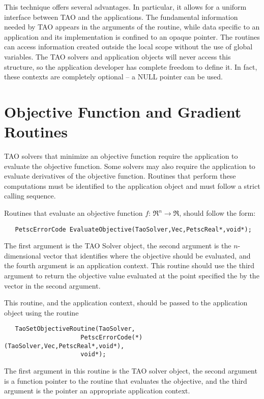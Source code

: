 This technique offers several advantages.
In particular, it allows for a uniform interface between TAO and 
the applications.   The fundamental information needed by TAO 
appears in the arguments of the routine, while data specific to an application
and its implementation is confined to an opaque pointer.
The routines can access information created outside the 
local scope without the use of global variables.
The TAO solvers and application objects will never access this structure, 
so the application developer has complete freedom to define it.  In fact,
these contexts are completely optional -- a NULL pointer can be used.



\section{Objective Function and Gradient Routines}\label{sec:fghj}

TAO solvers that minimize an objective function require
the application to evaluate the objective function.  Some solvers
may also require the application to evaluate
derivatives of the objective function.  
Routines that perform these computations must be identified
to the application object and must follow a strict calling sequence.

Routines that evaluate an objective function $f: \, \Re^n \to \Re$,
should follow the form:
\begin{verbatim}
   PetscErrorCode EvaluateObjective(TaoSolver,Vec,PetscReal*,void*);
\end{verbatim}
\noindent
The first argument is the TAO Solver object, the second argument is the
$n$-dimensional vector that identifies where the objective should be evaluated, 
and the fourth argument is an application context.
This routine should use the third argument to return the objective value 
evaluated at the point
specified the by the vector in the second argument.

This routine, and the application context, should be passed to the 
application object using
the routine 
\begin{verbatim}
   TaoSetObjectiveRoutine(TaoSolver,
                     PetscErrorCode(*)(TaoSolver,Vec,PetscReal*,void*),
                     void*);
\end{verbatim}
\noindent
The first argument in this routine is the TAO solver object, 
the second argument is a function pointer to the routine that 
evaluates the objective, and the third
argument is the pointer an appropriate application context.  

